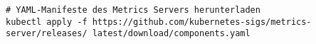 \begin{verbatim}
# YAML-Manifeste des Metrics Servers herunterladen
kubectl apply -f https://github.com/kubernetes-sigs/metrics-server/releases/ latest/download/components.yaml
\end{verbatim}